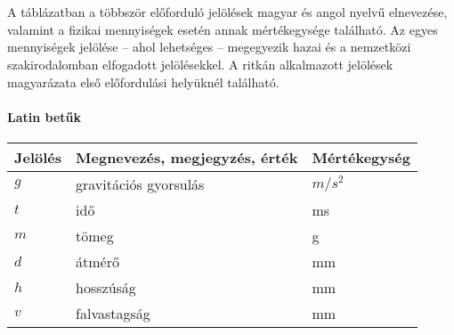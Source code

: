 \newcommand{\tss}{\textsuperscript}     %
\chapter*{\jelolesek}

A táblázatban a többször előforduló jelölések magyar és angol nyelvű elnevezése, 
valamint a fizikai mennyiségek esetén annak mértékegysége található. Az egyes 
mennyiségek jelölése – ahol lehetséges – megegyezik hazai és a nemzetközi 
szakirodalomban elfogadott jelölésekkel. A ritkán alkalmazott jelölések 
magyarázata első előfordulási helyüknél található.



\def\arraystretch{1.5}%

\subsubsection*{Latin betűk}
\begin{center}
    \begin{tabular}{lp{10cm}l}
        \hline
        Jelölés & Megnevezés, megjegyzés, érték & Mértékegység   \\ 
        \hline
        $g $       & gravitációs gyorsulás         & $m / s^{2}$\\
        $t $       & idő                           & ms \\
        $m $       & tömeg                         & g  \\
        $d $       & átmérő                        & mm \\
        $h $       & hosszúság                     & mm \\
        $v $       & falvastagság                  & mm \\
        \hline
    \end{tabular}    
\end{center}



